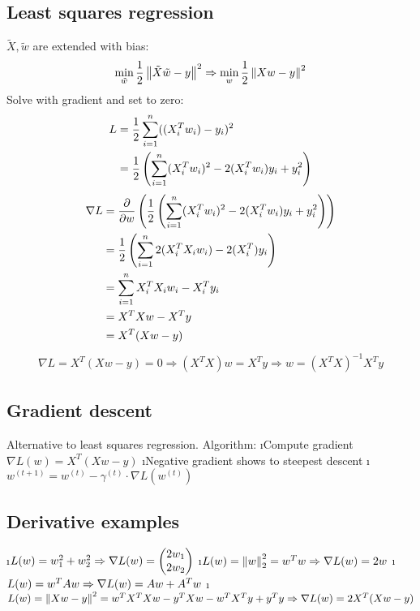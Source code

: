 \subsection{Least squares regression}
$\tilde X, \tilde w$ are extended with bias:
\begin{align*}
\min_{\tilde w} \frac{1}{2} \left\lVert\tilde X \tilde w - y\right\rVert^2 \Rightarrow \min_w \frac{1}{2} \left\lVert Xw-y\right\rVert^2
\end{align*}
Solve with gradient and set to zero:
\begin{align*}
L &= \frac{1}{2} \displaystyle\sum_{i=1}^n ((X_i^Tw_i)-y_i)^2 \\
&= \frac{1}{2} \left(\displaystyle\sum_{i=1}^n (X_i^Tw_i)^2 - 2(X_i^Tw_i)y_i + y_i^2 \right) \\
\end{align*}
\begin{align*}
  \nabla L &= \frac{\partial}{\partial w} \left(  \frac{1}{2} \left(\displaystyle\sum_{i=1}^n (X_i^Tw_i)^2 - 2(X_i^Tw_i)y_i + y_i^2 \right) \right)\\
  &= \frac{1}{2} \left(\displaystyle\sum_{i=1}^n 2(X_i^TX_iw_i) - 2(X_i^T)y_i \right)\\
  &= \displaystyle\sum_{i=1}^n X_i^TX_iw_i - X_i^Ty_i\\
  &= X^TXw - X^Ty\\
  &= X^T(Xw-y)
\end{align*}
\begin{align*}
\nabla L = X^T(Xw-y) = 0 \Rightarrow (X^TX)w = X^Ty \Rightarrow w = (X^TX)^{-1}X^Ty
\end{align*}

\subsection{Gradient descent}
Alternative to least squares regression. Algorithm:
\be
\i Compute gradient $\nabla L(w) = X^T(Xw-y)$
\i Negative gradient shows to steepest descent
\i $w^{(t+1)} = w^{(t)} - \gamma^{(t)} \cdot \nabla L(w^{(t)})$
\ee

\subsection{Derivative examples}

\bi
\i $L(w) = w_1^2 + w_2^2 \\\Rightarrow \nabla L(w) = \begin{pmatrix} 2w_1\\2w_2 \end{pmatrix}$
\i $L(w) = \left\lVert w\right\rVert ^2_2 = w^Tw \\\Rightarrow \nabla L(w) = 2w$
\i $L(w) = w^TAw \\\Rightarrow \nabla L(w) = Aw + A^Tw$
\i $L(w) = \left\lVert Xw-y\right\rVert^2 = w^TX^TXw - y^TXw - w^TX^Ty + y^Ty \\\Rightarrow \nabla L(w) = 2X^T(Xw - y)$
\ei

